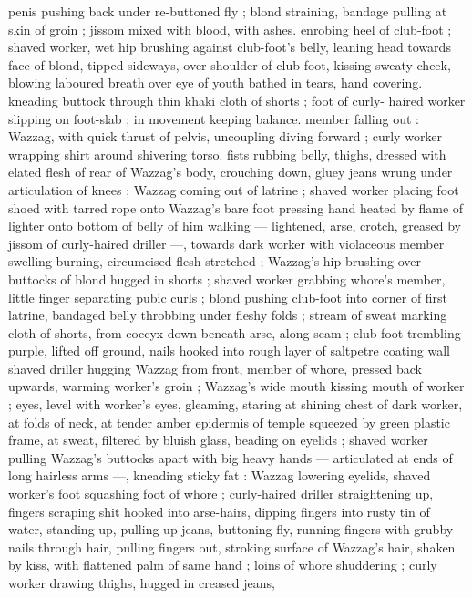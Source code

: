 penis pushing back under re-buttoned fly ; blond straining, bandage 
pulling at skin of groin ; jissom mixed with blood, with ashes. 
enrobing heel of club-foot ; shaved worker, wet hip brushing against 
club-foot's belly, leaning head towards face of blond, tipped 
sideways, over shoulder of club-foot, kissing sweaty cheek, blowing 
laboured breath over eye of youth bathed in tears, hand covering. 
kneading buttock through thin khaki cloth of shorts ; foot of curly- 
haired worker slipping on foot-slab ; in movement keeping balance. 
member falling out : Wazzag, with quick thrust of pelvis, uncoupling 
diving forward ; curly worker wrapping shirt around shivering torso. 
fists rubbing belly, thighs, dressed with elated flesh of rear of 
Wazzag's body, crouching down, gluey jeans wrung under 
articulation of knees ; Wazzag coming out of latrine ; shaved worker 
placing foot shoed with tarred rope onto Wazzag's bare foot 
pressing hand heated by flame of lighter onto bottom of belly of him 
walking --- lightened, arse, crotch, greased by jissom of curly-haired 
driller ---, towards dark worker with violaceous member swelling 
burning, circumcised flesh stretched ; Wazzag's hip brushing over 
buttocks of blond hugged in shorts ; shaved worker grabbing 
whore's member, little finger separating pubic curls ; blond pushing 
club-foot into corner of first latrine, bandaged belly throbbing under 
fleshy folds ; stream of sweat marking cloth of shorts, from coccyx 
down beneath arse, along seam ; club-foot trembling purple, lifted 
off ground, nails hooked into rough layer of saltpetre coating wall 
shaved driller hugging Wazzag from front, member of whore, 
pressed back upwards, warming worker's groin ; Wazzag's wide 
mouth kissing mouth of worker ; eyes, level with worker's eyes, 
gleaming, staring at shining chest of dark worker, at folds of neck, at 
tender amber epidermis of temple squeezed by green plastic frame, 
at sweat, filtered by bluish glass, beading on eyelids ; shaved worker 
pulling Wazzag's buttocks apart with big heavy hands --- articulated 
at ends of long hairless arms ---, kneading sticky fat : Wazzag 
lowering eyelids, shaved worker's foot squashing foot of whore ; 
curly-haired driller straightening up, fingers scraping shit hooked 
into arse-hairs, dipping fingers into rusty tin of water, standing up, 
pulling up jeans, buttoning fly, running fingers with grubby nails 
through hair, pulling fingers out, stroking surface of Wazzag's hair, 
shaken by kiss, with flattened palm of same hand ; loins of whore 
shuddering ; curly worker drawing thighs, hugged in creased jeans, 
